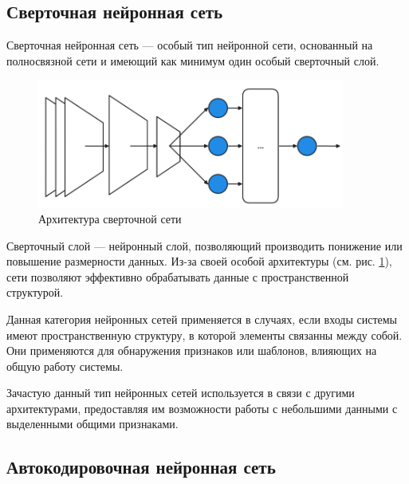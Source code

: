\subsection{Сверточная нейронная сеть}

Сверточная нейронная сеть — особый тип нейронной сети, основанный на
полносвязной сети и имеющий как минимум один особый сверточный слой. 

\begin{figure}[htbp]
  \centering
    \includegraphics[width=0.9\textwidth]{figures/arch_cnn.png}
  \caption{Архитектура сверточной сети}\label{fig:cnn}
\end{figure}

Сверточный слой — нейронный слой, позволяющий производить понижение или повышение
размерности данных. Из-за своей особой архитектуры (см. рис. \ref{fig:cnn}),
сети позволяют эффективно обрабатывать данные с пространственной структурой.

Данная категория нейронных сетей применяется в случаях, если входы системы
имеют пространственную структуру, в которой элементы связанны между собой. Они
применяются для обнаружения признаков или шаблонов, влияющих на общую работу
системы.

Зачастую данный тип нейронных сетей используется в связи с другими
архитектурами, предоставляя им возможности работы с небольшими данными с
выделенными общими признаками.

\subsection{Автокодировочная нейронная сеть}


